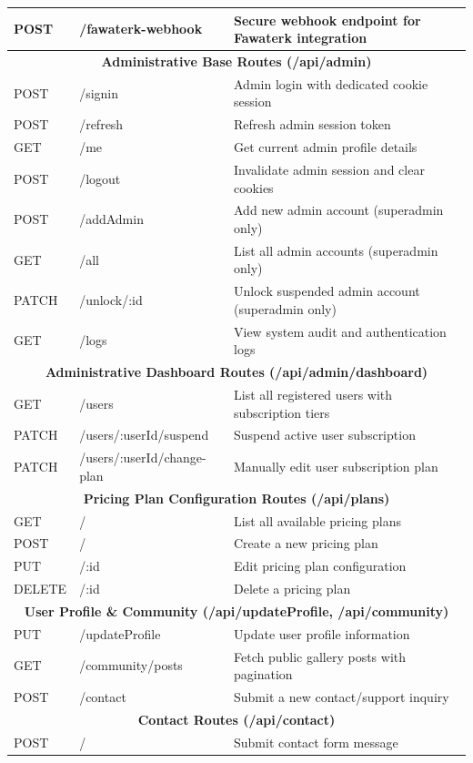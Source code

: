 \begin{longtable}{|p{2cm}|p{4cm}|p{6.5cm}|}
    \hline
    POST & /fawaterk-webhook & Secure webhook endpoint for Fawaterk integration \\
    \hline
    \multicolumn{3}{|c|}{\textbf{Administrative Base Routes (/api/admin)}} \\
    \hline
    POST & /signin & Admin login with dedicated cookie session \\
    \hline
    POST & /refresh & Refresh admin session token \\
    \hline
    GET & /me & Get current admin profile details \\
    \hline
    POST & /logout & Invalidate admin session and clear cookies \\
    \hline
    POST & /addAdmin & Add new admin account (superadmin only) \\
    \hline
    GET & /all & List all admin accounts (superadmin only) \\
    \hline
    PATCH & /unlock/:id & Unlock suspended admin account (superadmin only) \\
    \hline
    GET & /logs & View system audit and authentication logs \\
    \hline
    \multicolumn{3}{|c|}{\textbf{Administrative Dashboard Routes (/api/admin/dashboard)}} \\
    \hline
    GET & /users & List all registered users with subscription tiers \\
    \hline
    PATCH & /users/:userId/suspend & Suspend active user subscription \\
    \hline
    PATCH & /users/:userId/change-plan & Manually edit user subscription plan \\
    \hline
    \multicolumn{3}{|c|}{\textbf{Pricing Plan Configuration Routes (/api/plans)}} \\
    \hline
    GET & / & List all available pricing plans \\
    \hline
    POST & / & Create a new pricing plan \\
    \hline
    PUT & /:id & Edit pricing plan configuration \\
    \hline
    DELETE & /:id & Delete a pricing plan \\
    \hline
    \multicolumn{3}{|c|}{\textbf{User Profile \& Community (/api/updateProfile, /api/community)}} \\
    \hline
    PUT & /updateProfile & Update user profile information \\
    \hline
    GET & /community/posts & Fetch public gallery posts with pagination \\
    \hline
    POST & /contact & Submit a new contact/support inquiry \\
    \hline
    \multicolumn{3}{|c|}{\textbf{Contact Routes (/api/contact)}} \\
    \hline
    POST & / & Submit contact form message \\
    \hline
\end{longtable}

